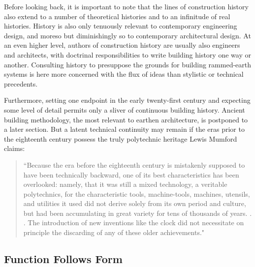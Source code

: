 \clearpage

Before looking back, it is important to note that the lines of construction history also extend to a number of theoretical histories and to an infinitude of real histories. History is also only tenuously relevant to contemporary engineering design, and moreso but diminishingly so to contemporary architectural design. At an even higher level, authors of construction history are usually also engineers and architects, with doctrinal responsibilities to write building history one way or another. \cite[p14]{CONSHISTORY} Consulting history to presuppose the grounds for building rammed-earth systems is here more concerned with the flux of ideas than stylistic or technical precedents.

Furthermore, setting one endpoint in the early twenty-first century and expecting some level of detail permits only a sliver of continuous building history. Ancient building methodology, the most relevant to earthen architecture, is postponed to a later section. But a latent technical continuity may remain if the eras prior to the eighteenth century possess the truly polytechnic heritage Lewis Mumford claims:

\begin{quote}
\small{
``Because the era before the eighteenth century is mistakenly supposed to have been technically backward, one of its best characteristics has been overlooked: namely, that it was still a mixed technology, a veritable polytechnics, for the characteristic tools, machine-tools, machines, utensils, and utilities it used did not derive solely from its own period and culture, but had been accumulating in great variety for tens of thousands of years. . . The introduction of new inventions like the clock did not necessitate on principle the discarding of any of these older achievements."} \cite[p134]{MYTHMACHINE}
\end{quote}

\subsection{Function Follows Form}

